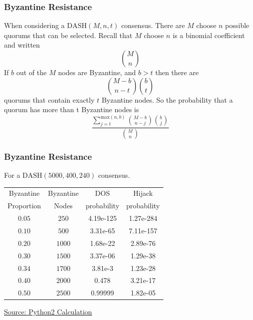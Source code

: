 \documentclass[english,handout]{beamer}
\begin{document}
\begin{frame}
\frametitle{Byzantine Resistance}

When considering a $\textrm{DASH}(M,n,t)$ consensus. There are $M$ choose $n$
possible quorums that can be selected. Recall that $M$ choose $n$ is a binomial
coefficient and written
\[
{M \choose n}
\]
If $b$ out of the $M$ nodes are Byzantine, and $b>t$ then there are
\[
{M-b \choose n-t}{b \choose t}
\]
quorums that contain exactly $t$ Byzantine nodes. So the probability that a quorum
has more than t Byzantine nodes is
\[
\frac{\sum_{j=t}^{\textrm{max}(n,b)} {M-b \choose n-j}{b \choose j}}{{M \choose n}}
\]

\end{frame}


\begin{frame}
\frametitle{Byzantine Resistance}
For a $\textrm{DASH}(5000,400,240)$ consensus.\\

\begin{center}
\begin{tabular}{|c|c|c|c|}
\hline
Byzantine & Byzantine & DOS  & Hijack \\
Proportion & Nodes & probability & probability\\
\hline
$0.05$ & $250$ & 4.19e-125& 1.27e-284\\
\hline
$0.10$ & $500$ & 3.31e-65& 7.11e-157\\
\hline
$0.20$ & $1000$ & 1.68e-22& 2.89e-76\\
\hline
$0.30$ & $1500$ & 3.37e-06& 1.29e-38\\
\hline
$0.34$ & $1700$ & 3.81e-3 & 1.23e-28\\
\hline
$0.40$ & $2000$ & 0.478& 3.21e-17\\
\hline
$0.50$ & $2500$ & 0.99999& 1.82e-05 \\
\hline
\end{tabular}
\end{center}
\begin{flushright}
\href{https://blog.tappmath.com/pages/script-for-calculating-byzantine-resistance/}{Source: Python2 Calculation}
\end{flushright}
\end{frame}
\end{document}
